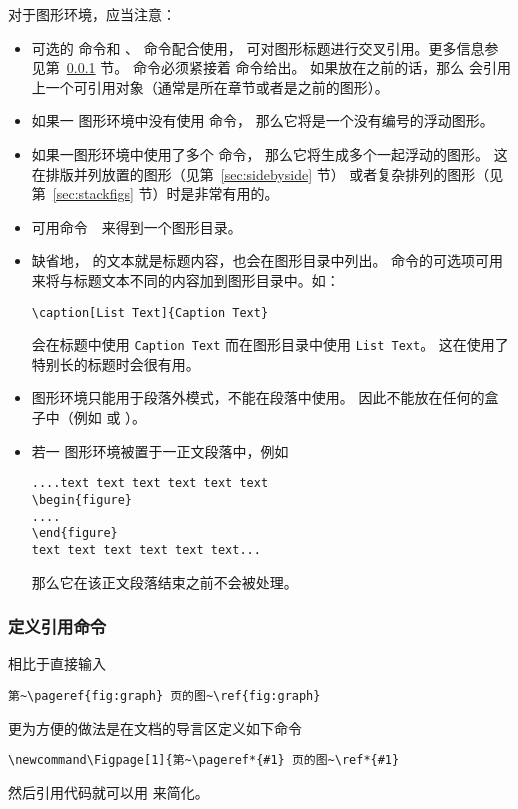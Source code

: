 对于图形环境，应当注意：
\begin{itemize}
	\item 可选的  命令和 、 命令配合使用，
	可对图形标题进行交叉引用。更多信息参见第~\ref{sssec:refcmd} 节。
	 命令必须紧接着  命令给出。
	如果放在之前的话，那么  会引用上一个可引用对象（通常是所在章节或者是之前的图形）。
	
	\item 如果一 图形环境中没有使用  命令，
	那么它将是一个没有编号的浮动图形。
	
	\item 如果一图形环境中使用了多个  命令，
	那么它将生成多个一起浮动的图形。
	这在排版并列放置的图形（见第~\ref{sec:sidebyside} 节）
	或者复杂排列的图形（见第~\ref{sec:stackfigs} 节）时是非常有用的。
	
	\item 可用命令~~来得到一个图形目录。
	\item 缺省地， 的文本就是标题内容，也会在图形目录中列出。
	 命令的可选项可用来将与标题文本不同的内容加到图形目录中。如：
\begin{lstlisting}
\caption[List Text]{Caption Text}
\end{lstlisting}
	会在标题中使用 \texttt{Caption Text} 而在图形目录中使用 \texttt{List Text}。
	这在使用了特别长的标题时会很有用。
	
	\item {} 图形环境只能用于段落外模式，不能在段落中使用。
	因此不能放在任何的盒子中（例如  或 ）。
	
	\item 若一  图形环境被置于一正文段落中，例如
\begin{lstlisting}
....text text text text text text 
\begin{figure} 
.... 
\end{figure} 
text text text text text text...      
\end{lstlisting}
	那么它在该正文段落结束之前不会被处理。
\end{itemize}

\subsubsection{定义引用命令}\label{sssec:refcmd}
相比于直接输入
\begin{lstlisting}
第~\pageref{fig:graph} 页的图~\ref{fig:graph}
\end{lstlisting}
更为方便的做法是在文档的导言区定义如下命令
\begin{lstlisting}
\newcommand\Figpage[1]{第~\pageref*{#1} 页的图~\ref*{#1}
\end{lstlisting}
然后引用代码就可以用  来简化。

